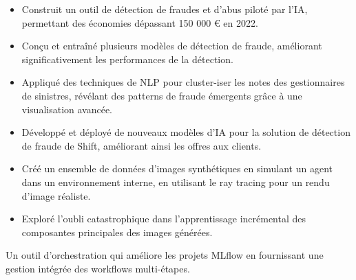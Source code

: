 \documentclass[10pt,letter,ragged2e,withhyper]{altacv}
\renewcommand{\divider}{\textcolor{body!30}{\hdashrule{\linewidth}{0.6pt}{0.5ex}}\medskip}
\begin{document}
\begin{paracol}{2}
\divider
{}

\begin{itemize}
  \item Construit un outil de détection de fraudes et d'abus piloté par l'IA, permettant des économies dépassant 150 000 € en 2022.
  \item Conçu et entraîné plusieurs modèles de détection de fraude, améliorant significativement les performances de la détection.
\end{itemize}

\divider
{}

\begin{itemize}
  \item Appliqué des techniques de NLP pour cluster-iser les notes des gestionnaires de sinistres, révélant des patterns de fraude émergents grâce à une visualisation avancée.
  \item Développé et déployé de nouveaux modèles d'IA pour la solution de détection de fraude de Shift, améliorant ainsi les offres aux clients.
\end{itemize}

\divider
{}

\begin{itemize}
  \item Créé un ensemble de données d'images synthétiques en simulant un agent dans un environnement interne, en utilisant le ray tracing pour un rendu d'image réaliste.
  \item Exploré l'oubli catastrophique dans l'apprentissage incrémental des composantes principales des images générées.
\end{itemize}





Un outil d'orchestration qui améliore les projets MLflow en fournissant une gestion intégrée des workflows multi-étapes.


\end{paracol}
\end{document}
